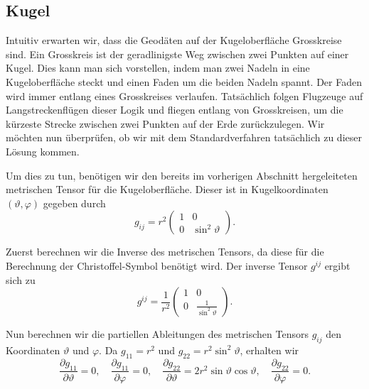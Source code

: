 %
%
%
%
\subsection{Kugel\label{geodaeten:section:Standardverfahren:Kugel}}

Intuitiv erwarten wir, dass die Geodäten auf der Kugeloberfläche Grosskreise sind.
%
Ein Grosskreis ist der geradlinigste Weg zwischen zwei Punkten auf einer Kugel.
Dies kann man sich vorstellen, indem man zwei Nadeln in eine Kugeloberfläche steckt und einen Faden um die beiden Nadeln spannt.
Der Faden wird immer entlang eines Grosskreises verlaufen.
Tatsächlich folgen Flugzeuge auf Langstreckenflügen dieser Logik und fliegen entlang von Grosskreisen, um die kürzeste Strecke zwischen zwei Punkten auf der Erde zurückzulegen.
%
%
Wir möchten nun überprüfen, ob wir mit dem Standardverfahren tatsächlich zu dieser Lösung kommen.

Um dies zu tun, benötigen wir den bereits im vorherigen Abschnitt hergeleiteten metrischen Tensor für die Kugeloberfläche.
Dieser ist in Kugelkoordinaten $(\vartheta, \varphi)$ gegeben durch
\begin{equation}
	g_{i\!j} = r^2 \begin{pmatrix}
		1 & 0 \\
		0 & \sin^2\vartheta
	\end{pmatrix}.
\end{equation}

Zuerst berechnen wir die Inverse des metrischen Tensors, da diese für die Berechnung der Christoffel-Symbol benötigt wird.
Der inverse Tensor $g^{i\!j}$ ergibt sich zu
\begin{equation}
	g^{i\!j} = \frac{1}{r^2} 
	\begin{pmatrix}
		1 & 0 \\
		0 & \frac{1}{\sin^2\vartheta}
	\end{pmatrix}.
	\label{geodaeten:equation:StaKugel:TensorInverse}
\end{equation}

Nun berechnen wir die partiellen Ableitungen des metrischen Tensors $g_{i\!j}$ den Koordinaten $\vartheta$ und $\varphi$.
Da $g_{11} = r^2$ und $g_{22} = r^2 \sin^2\vartheta$, erhalten wir
\begin{equation}
	\frac{\partial g_{11}}{\partial \vartheta} = 0, \quad \frac{\partial g_{11}}{\partial \varphi} = 0, \quad \frac{\partial g_{22}}{\partial \vartheta} = 2r^2 \sin\vartheta \cos\vartheta, \quad \frac{\partial g_{22}}{\partial \varphi} = 0.
	\label{geodaeten:equation:StaKugel:Ableitungen}
\end{equation}


